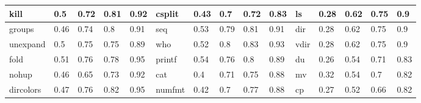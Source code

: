 \begin{table*}[h!]
\begin{center}
\begin{tabular}{ | l | l | l | l | l || l | l | l | l | l || l | l | l | l | l | }
	kill & 0.5 & 0.72 & 0.81 & 0.92 & csplit & 0.43 & 0.7 & 0.72 & 0.83 & ls & 0.28 & 0.62 & 0.75 & 0.9 \\ \hline
	groups & 0.46 & 0.74 & 0.8 & 0.91 & seq & 0.53 & 0.79 & 0.81 & 0.91 & dir & 0.28 & 0.62 & 0.75 & 0.9 \\ \hline
	unexpand & 0.5 & 0.75 & 0.75 & 0.89 & who & 0.52 & 0.8 & 0.83 & 0.93 & vdir & 0.28 & 0.62 & 0.75 & 0.9 \\ \hline
	fold & 0.51 & 0.76 & 0.78 & 0.95 & printf & 0.54 & 0.76 & 0.8 & 0.89 & du & 0.26 & 0.54 & 0.71 & 0.83 \\ \hline
	nohup & 0.46 & 0.65 & 0.73 & 0.92 & cat & 0.4 & 0.71 & 0.75 & 0.88 & mv & 0.32 & 0.54 & 0.7 & 0.82 \\ \hline
	dircolors & 0.47 & 0.76 & 0.82 & 0.95 & numfmt & 0.42 & 0.7 & 0.77 & 0.88 & cp & 0.27 & 0.52 & 0.66 & 0.82 \\ \hline
\end{tabular}
\end{center}
\end{table*}

